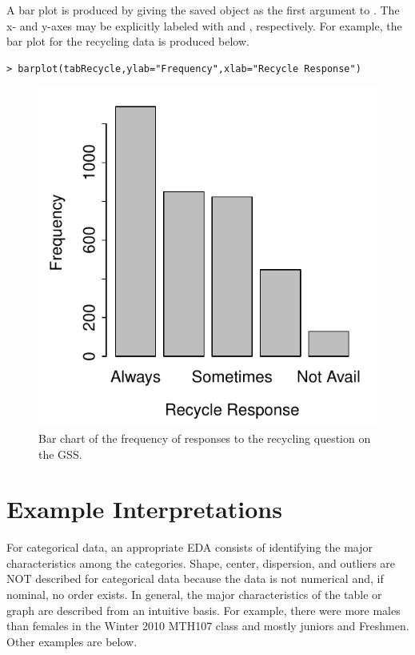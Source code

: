 \documentclass[10pt,openany]{book}\usepackage[]{graphicx}\usepackage[]{color}
\makeatletter
\newenvironment{kframe}{%
 \def\at@end@of@kframe{}%
 \ifinner\ifhmode%
  \def\at@end@of@kframe{\end{minipage}}%
  \begin{minipage}{\columnwidth}%
 \fi\fi%
 \def\FrameCommand##1{\hskip\@totalleftmargin \hskip-\fboxsep
 \colorbox{shadecolor}{##1}\hskip-\fboxsep
     \hskip-\linewidth \hskip-\@totalleftmargin \hskip\columnwidth}%
 \MakeFramed {\advance\hsize-\width
   \@totalleftmargin\z@ \linewidth\hsize
   \@setminipage}}%
 {\par\unskip\endMakeFramed%
 \at@end@of@kframe}
\newenvironment{knitrout}{}{} %
\makeatother
\begin{document}
A bar plot is produced by giving the saved  object as the first argument to . The x- and y-axes may be explicitly labeled with  and , respectively. For example, the bar plot for the recycling data  is produced below.
\begin{knitrout}
\color{fgcolor}\begin{kframe}
\begin{verbatim}
> barplot(tabRecycle,ylab="Frequency",xlab="Recycle Response")
\end{verbatim}
\end{kframe}\begin{figure}[hbtp]

{\centering \includegraphics[width=.55\linewidth]{Figs/Barchart1-1} 

}

\caption[Bar chart of the frequency of responses to the recycling question on the GSS]{Bar chart of the frequency of responses to the recycling question on the GSS.}\label{fig:Barchart1}
\end{figure}


\end{knitrout}


\section{Example Interpretations}
For categorical data, an appropriate EDA consists of identifying the major characteristics among the categories. Shape, center, dispersion, and outliers are NOT described for categorical data because the data is not numerical and, if nominal, no order exists. In general, the major characteristics of the table or graph are described from an intuitive basis. For example, there were more males than females in the Winter 2010 MTH107 class and mostly juniors and Freshmen. Other examples are below.
\end{document}
